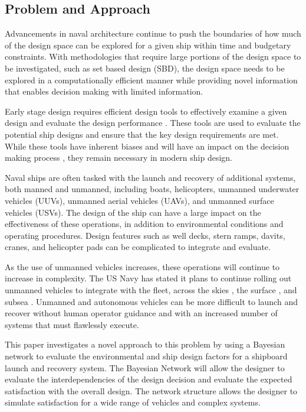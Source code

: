 \documentclass{svproc}
\begin{document}
\subsection{Problem and Approach}

Advancements in naval architecture continue to push the boundaries of how much of the design space can be explored for a given ship within time and budgetary constraints. With methodologies that require large portions of the design space to be investigated, such as set based design (SBD), \cite{singer_sbd_09}  the design space needs to be explored in a computationally efficient manner while providing novel information that enables decision making with limited information. 

Early stage design requires efficient design tools to effectively examine a given design and evaluate the design performance \cite{whitcomb_naval_1998}. These tools are used to evaluate the potential ship designs and ensure that the key design requirements are met. While these tools have inherent biases and will have an impact on the decision making process \cite{sypniewski_framework_2017}, they remain necessary in modern ship design. 

Naval ships are often tasked with the launch and recovery of additional systems, both manned and unmanned, including boats, helicopters, unmanned underwater vehicles (UUVs), unmanned aerial vehicles (UAVs), and unmanned surface vehicles (USVs). The design of the ship can have a large impact on the effectiveness of these operations, in addition to environmental conditions and operating procedures. Design features such as well decks, stern ramps, davits, cranes, and helicopter pads can be complicated to integrate and evaluate. 

As the use of unmanned vehicles increases, these operations will continue to increase in complexity. The US Navy has stated it plans to continue rolling out unmanned vehicles to integrate with the fleet, across the skies \cite{crs_drones}, the surface \cite{lagrone_navy_2019}, and subsea \cite{us_navy_navy_2004}. Unmanned and autonomous vehicles can be more difficult to launch and recover without human operator guidance and with an increased number of systems that must flawlessly execute. 

This paper investigates a novel approach to this problem by using a Bayesian network to evaluate the environmental and ship design factors for a shipboard launch and recovery system. The Bayesian Network will allow the designer to evaluate the interdependencies of the design decision and evaluate the expected satisfaction with the overall design. The network structure allows the designer to simulate satisfaction for a wide range of vehicles and complex systems. 
\end{document}

